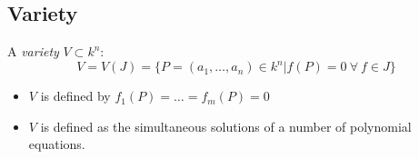 \documentclass{article}
\theoremstyle{definition}
\newenvironment{defn}[1]
{\renewcommand\theinnerdefn{#1}\innerdefn}
{\endinnerdefn}
\begin{document}
\vspace{0.5cm}
\subsection{Variety}

\begin{defn}{5.3}[Variety]
  A \emph{variety} $V \subset k^n$:
  $$ V = V(J) = \{ P=(a_1, \ldots, a_n) \in k^n | f(P)=0 ~\forall~ f \in J \}$$

  \begin{itemize}
    \item[$\rightarrow$] $V$ is defined by $f_1(P)= \ldots = f_m(P) = 0$
    \item[$\rightarrow$] $V$ is defined as the simultaneous solutions of a number of polynomial equations.
  \end{itemize}
\end{defn}
\end{document}
